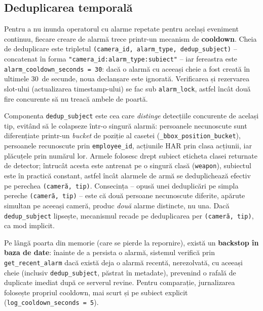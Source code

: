\documentclass[../../main.tex]{subfiles}
\begin{document}
\subsection{Deduplicarea temporală}
\label{subsec:dedup}

Pentru a nu inunda operatorul cu alarme repetate pentru același eveniment continuu, fiecare creare de alarmă trece printr-un mecanism de \textbf{cooldown}. Cheia de deduplicare este tripletul \texttt{(camera\_id, alarm\_type, dedup\_subject)} -- concatenat în forma \texttt{"camera\_id:alarm\_type:subiect"} -- iar fereastra este \texttt{alarm\_cooldown\_seconds = 30}: dacă o alarmă cu aceeași cheie a fost creată în ultimele 30~de secunde, noua declanșare este ignorată. Verificarea și rezervarea slot-ului (actualizarea timestamp-ului) se fac sub \texttt{alarm\_lock}, astfel încât două fire concurente să nu treacă ambele de poartă.

Componenta \texttt{dedup\_subject} este cea care \emph{distinge} detecțiile concurente de același tip, evitând să le colapseze într-o singură alarmă: persoanele necunoscute sunt diferențiate printr-un \emph{bucket} de poziție al casetei (\texttt{\_bbox\_position\_\linebreak bucket}), persoanele recunoscute prin \texttt{employee\_id}, acțiunile HAR prin clasa acțiunii, iar plăcuțele prin numărul lor. Armele folosesc drept subiect eticheta clasei returnate de detector; întrucât acesta este antrenat pe o singură clasă (\texttt{weapon}), subiectul este în practică constant, astfel încât alarmele de armă se deduplichează efectiv pe perechea \texttt{(cameră, tip)}. Consecința -- opusă unei deduplicări pe simpla pereche \texttt{(cameră, tip)} -- este că două persoane necunoscute diferite, apărute simultan pe aceeași cameră, produc \emph{două} alarme distincte, nu una. Dacă \texttt{dedup\_subject} lipsește, mecanismul recade pe deduplicarea per \texttt{(cameră, tip)}, ca mod implicit.

Pe lângă poarta din memorie (care se pierde la repornire), există un \linebreak \textbf{backstop în baza de date}: înainte de a persista o alarmă, sistemul verifică prin \texttt{get\_recent\_alarm} dacă există deja o alarmă recentă, nerezolvată, cu aceeași cheie (inclusiv \texttt{dedup\_subject}, păstrat în metadate), prevenind o rafală de duplicate imediat după ce serverul revine. Pentru comparație, jurnalizarea folosește propriul cooldown, mai scurt și pe subiect explicit (\texttt{log\_cooldown\_\linebreak seconds = 5}).
\end{document}
